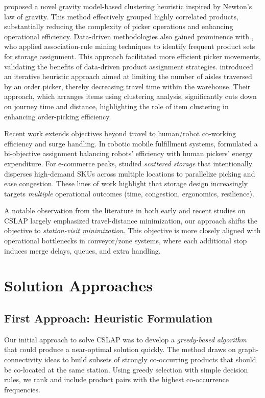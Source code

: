 \documentclass[11pt]{elsarticle}
\begin{document}
\cite{ansari2020} proposed a novel gravity model-based clustering heuristic inspired by Newton’s law of gravity. This method effectively grouped highly correlated products, substantially reducing the complexity of picker operations and enhancing operational efficiency.
Data-driven methodologies also gained prominence with \cite{pang2016}, who applied association-rule mining techniques to identify frequent product sets for storage assignment. This approach facilitated more efficient picker movements, validating the benefits of data-driven product assignment strategies.
 \cite{Egas2010-zb} introduced an iterative heuristic approach aimed at limiting the number of aisles traversed by an order picker, thereby decreasing travel time within the warehouse. Their approach, which arranges items using clustering analysis, significantly cuts down on journey time and distance, highlighting the role of item clustering in enhancing order-picking efficiency.

Recent work extends objectives beyond travel to human/robot co-working efficiency and surge handling. In robotic mobile fulfillment systems, \citet{zhang2023rmfs} formulated a bi-objective assignment balancing robots’ efficiency with human pickers’ energy expenditure. For e-commerce peaks, \citet{liu2023scattered} studied \emph{scattered storage} that intentionally disperses high-demand SKUs across multiple locations to parallelize picking and ease congestion. These lines of work highlight that storage design increasingly targets \emph{multiple} operational outcomes (time, congestion, ergonomics, resilience). 

A notable observation from the literature in both early and recent studies on CSLAP largely emphasized travel-distance minimization, our approach shifts the objective to \emph{station-visit minimization}. This objective is more closely aligned with operational bottlenecks in conveyor/zone systems, where each additional stop induces merge delays, queues, and extra handling.



\section{Solution Approaches}\label{sec:solution_approaches}

\subsection{First Approach: Heuristic Formulation}
Our initial approach to solve CSLAP was to develop a \emph{greedy-based algorithm} that could produce a near-optimal solution quickly. The method draws on graph-connectivity ideas \cite{west2001introduction} to build subsets of strongly co-occurring products that should be co-located at the same station. Using greedy selection with simple decision rules, we rank and include product pairs with the highest co-occurrence frequencies.
\end{document}
